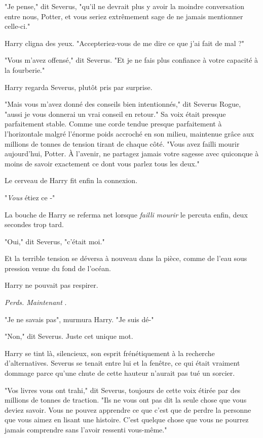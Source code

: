 "Je pense," dit Severus, "qu'il ne devrait plus y avoir la moindre conversation entre nous, Potter, et vous seriez extrêmement sage de ne jamais mentionner celle-ci."

Harry cligna des yeux. "Accepteriez-vous de me dire ce que j'ai fait de mal ?"

"Vous m'avez offensé," dit Severus. "Et je ne fais plus confiance à votre capacité à la fourberie."

Harry regarda Severus, plutôt pris par surprise.

"Mais vous m'avez donné des conseils bien intentionnés," dit Severus Rogue, "aussi je vous donnerai un vrai conseil en retour." Sa voix était presque parfaitement stable. Comme une corde tendue presque parfaitement à l'horizontale malgré l'énorme poids accroché en son milieu, maintenue grâce aux millions de tonnes de tension tirant de chaque côté. "Vous avez failli mourir aujourd'hui, Potter. À l'avenir, ne partagez jamais votre sagesse avec quiconque à moins de savoir exactement ce dont vous parlez tous les deux."

Le cerveau de Harry fit enfin la connexion.

"\emph{Vous}  étiez ce -"

La bouche de Harry se referma net lorsque \emph{failli mourir}  le percuta enfin, deux secondes trop tard.

"Oui," dit Severus, "c'était moi."

Et la terrible tension se déversa à nouveau dans la pièce, comme de l'eau sous pression venue du fond de l'océan.

Harry ne pouvait pas respirer.

\emph{Perds. Maintenant} .

"Je ne savais pas", murmura Harry. "Je suis dé-"

"Non," dit Severus. Juste cet unique mot.

Harry se tint là, silencieux, son esprit frénétiquement à la recherche d'alternatives. Severus se tenait entre lui et la fenêtre, ce qui était vraiment dommage parce qu'une chute de cette hauteur n'aurait pas tué un sorcier.

"Vos livres vous ont trahi," dit Severus, toujours de cette voix étirée par des millions de tonnes de traction. "Ils ne vous ont pas dit la seule chose que vous deviez savoir. Vous ne pouvez apprendre ce que c'est que de perdre la personne que vous aimez en lisant une histoire. C'est quelque chose que vous ne pourrez jamais comprendre sans l'avoir ressenti vous-même."


